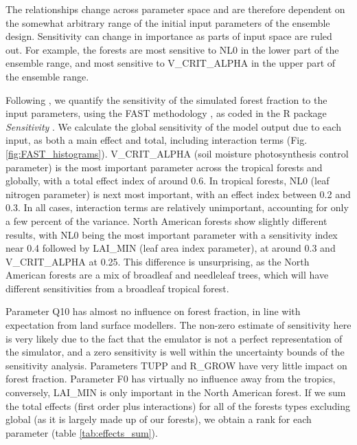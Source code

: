\documentclass[esd, manuscript]{copernicus}
\begin{document}
The relationships change across parameter space and are therefore dependent on the somewhat arbitrary range of the initial input parameters of the ensemble design. Sensitivity can change in importance as parts of input space are ruled out. For example, the forests are most sensitive to NL0 in the lower part of the ensemble range, and most sensitive to V\_CRIT\_ALPHA in the upper part of the ensemble range.


Following \citep{carslaw2013large}, we quantify the sensitivity of the simulated forest fraction to the input parameters, using the FAST methodology \citep{saltelli1999sensitivity}, as coded in the R package \emph{Sensitivity} \citep{Rpackage2015sensitivity}. We calculate the global sensitivity of the model output due to each input, as both a main effect and total, including interaction terms (Fig.  \ref{fig:FAST_histograms}). V\_CRIT\_ALPHA (soil moisture photosynthesis control parameter) is the most important parameter across the tropical forests and globally, with a total effect index of around 0.6. In tropical forests, NL0 (leaf nitrogen parameter) is next most important, with an effect index between 0.2 and 0.3. In all cases, interaction terms are relatively unimportant, accounting for only a few percent of the variance. North American forests show slightly different results, with NL0 being the most important parameter with a sensitivity index near 0.4 followed by LAI\_MIN (leaf area index parameter), at around 0.3 and V\_CRIT\_ALPHA at 0.25. This difference is unsurprising, as the North American forests are a mix of broadleaf and needleleaf trees, which will have different sensitivities from a broadleaf tropical forest.


Parameter Q10 has almost no influence on forest fraction, in line with expectation from land surface modellers. The non-zero estimate of sensitivity here is very likely due to the fact that the emulator is not a perfect representation of the simulator, and a zero sensitivity is well within the uncertainty bounds of the sensitivity analysis. Parameters TUPP and R\_GROW have very little impact on forest fraction. Parameter F0 has virtually no influence away from the tropics, conversely, LAI\_MIN is only important in the North American forest. If we sum the total effects (first order plus interactions) for all of the forests types excluding global (as it is largely made up of our forests), we obtain a rank for each parameter (table \ref{tab:effects_sum}).
\end{document}
